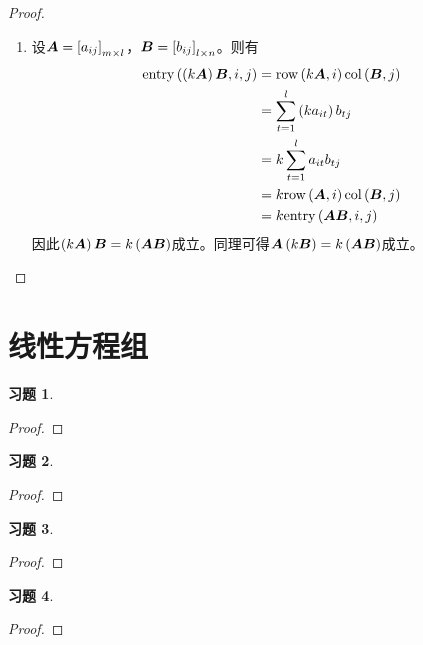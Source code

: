 \documentclass{ctexart}
\newtheorem{problem}{习题}[section]
\begin{document}
\begin{proof}
\begin{enumerate}
        \item
              {
              设\(\boldsymbol{A}=\left[ a_{ij} \right]_{m\times l}\)，\(\boldsymbol{B}=\left[ b_{ij} \right]_{l\times n}\)。则有
              \begin{align*}
                  \mathrm{entry}\left( \left( k\boldsymbol{A} \right)\boldsymbol{B},i,j \right) & =\mathrm{row}\left( k\boldsymbol{A},i \right)\mathrm{col}\left( \boldsymbol{B},j \right)     \\
                                                    & =\sum_{t=1}^l\left( ka_{it} \right)b_{tj} \\
                                                    & =k\sum_{t=1}^la_{it}b_{tj}         \\
                                                    & =k\mathrm{row}\left( \boldsymbol{A},i \right)\mathrm{col}\left( \boldsymbol{B},j \right)     \\
                                                    & =k\mathrm{entry}\left( \boldsymbol{A}\boldsymbol{B},i,j \right)
              \end{align*}
              因此\(\left( k\boldsymbol{A} \right)\boldsymbol{B}=k\left( \boldsymbol{A}\boldsymbol{B} \right)\)成立。同理可得\(\boldsymbol{A}\left( k\boldsymbol{B} \right)=k\left( \boldsymbol{A}\boldsymbol{B} \right)\)成立。
              }
    \end{enumerate}
\end{proof}

\clearpage
\section{线性方程组}

\setcounter{problem}{3}
\begin{problem}
\end{problem}
\begin{proof}

\end{proof}

\begin{problem}
\end{problem}
\begin{proof}

\end{proof}

\begin{problem}
\end{problem}
\begin{proof}

\end{proof}

\begin{problem}
\end{problem}
\begin{proof}

\end{proof}
\end{document}
